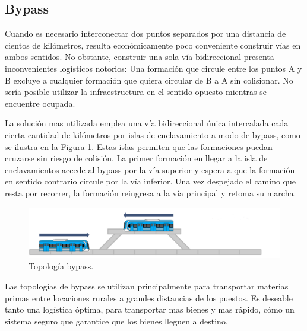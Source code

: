 \subsection{Bypass}

Cuando es necesario interconectar dos puntos separados por una distancia de cientos de kilómetros, resulta económicamente poco conveniente construir vías en ambos sentidos. No obstante, construir una sola vía bidireccional presenta inconvenientes logísticos notorios: Una formación que circule entre los puntos A y B excluye a cualquier formación que quiera circular de B a A sin colisionar. No sería posible utilizar la infraestructura en el sentido opuesto mientras se encuentre ocupada.

La solución mas utilizada emplea una vía bidireccional única intercalada cada cierta cantidad de kilómetros por islas de enclavamiento a modo de bypass, como se ilustra en la Figura \ref{fig:bypass_1}. Estas islas permiten que las formaciones puedan cruzarse sin riesgo de colisión. La primer formación en llegar a la isla de enclavamientos accede al bypass por la vía superior y espera a que la formación en sentido contrario circule por la vía inferior. Una vez despejado el camino que resta por recorrer, la formación reingresa a la vía principal y retoma su marcha.

    \begin{figure}[h]
        \centering
        \includegraphics[width=1\textwidth]{Figuras/bypass}
        \centering\caption{Topología bypass.}
        \label{fig:bypass_1}
    \end{figure}
    
Las topologías de bypass se utilizan principalmente para transportar materias primas entre locaciones rurales a grandes distancias de los puestos. Es deseable tanto una logística óptima, para transportar mas bienes y mas rápido, cómo un sistema seguro que garantice que los bienes lleguen a destino.